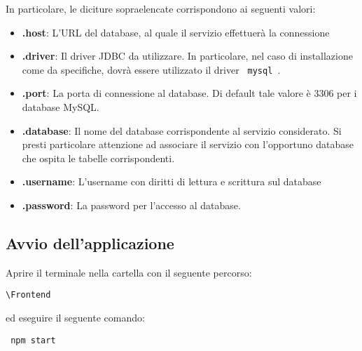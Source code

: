 In particolare, le diciture sopraelencate corrispondono ai seguenti valori:

\begin{itemize}
	\item \textbf{.host}: L'URL del database, al quale il servizio effettuerà la connessione
	\item \textbf{.driver}: Il driver JDBC da utilizzare. In particolare, nel caso di installazione come da specifiche, dovrà essere utilizzato il driver \verb| mysql |.
	\item \textbf{.port}: La porta di connessione al database. Di default tale valore è 3306 per i database MySQL.
	\item \textbf{.database}: Il nome del database corrispondente al servizio considerato. Si presti particolare attenzione ad associare il servizio con l'opportuno database che ospita le tabelle corrispondenti.
	\item \textbf{.username}: L'username con diritti di lettura e scrittura sul database
	\item \textbf{.password}: La password per l'accesso al database.
\end{itemize}

\subsection{Avvio dell'applicazione}
Aprire il terminale nella cartella con il seguente percorso:
\begin{center}
	\verb|\Frontend| 
\end{center} 
ed eseguire il seguente comando:
\begin{center}
	\verb| npm start|
\end{center}


